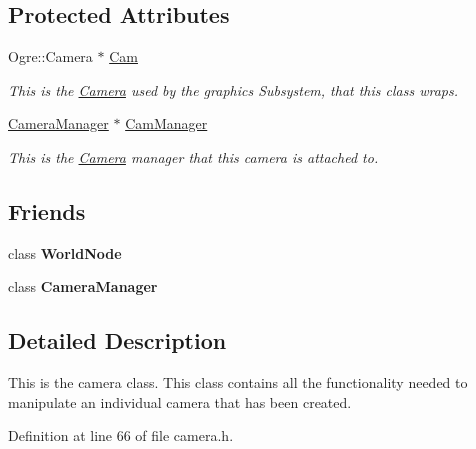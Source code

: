 \subsection*{Protected Attributes}
\begin{DoxyCompactItemize}
\item 
Ogre::Camera $\ast$ \hyperlink{classphys_1_1Camera_a91622148b9b9a9ae1554c828f7e2fc89}{Cam}
\begin{DoxyCompactList}\small\item\em This is the \hyperlink{classphys_1_1Camera}{Camera} used by the graphics Subsystem, that this class wraps. \item\end{DoxyCompactList}\item 
\hyperlink{classphys_1_1CameraManager}{CameraManager} $\ast$ \hyperlink{classphys_1_1Camera_a909203ede748deb1b587a8758ba8cec4}{CamManager}
\begin{DoxyCompactList}\small\item\em This is the \hyperlink{classphys_1_1Camera}{Camera} manager that this camera is attached to. \item\end{DoxyCompactList}\end{DoxyCompactItemize}
\subsection*{Friends}
\begin{DoxyCompactItemize}
\item 
\hypertarget{classphys_1_1Camera_a1cacd07efb11226da49a7c80569b18e8}{
class {\bfseries WorldNode}}
\label{d9/df8/classphys_1_1Camera_a1cacd07efb11226da49a7c80569b18e8}

\item 
\hypertarget{classphys_1_1Camera_afae5bf9a900e8c5bc70c9332785e8465}{
class {\bfseries CameraManager}}
\label{d9/df8/classphys_1_1Camera_afae5bf9a900e8c5bc70c9332785e8465}

\end{DoxyCompactItemize}


\subsection{Detailed Description}
This is the camera class. This class contains all the functionality needed to manipulate an individual camera that has been created. 

Definition at line 66 of file camera.h.



